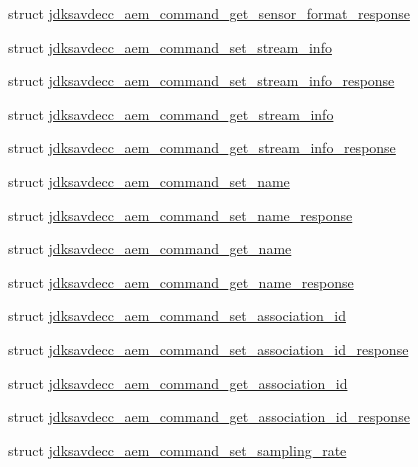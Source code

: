 \begin{DoxyCompactItemize}
\item 
struct \hyperlink{structjdksavdecc__aem__command__get__sensor__format__response}{jdksavdecc\+\_\+aem\+\_\+command\+\_\+get\+\_\+sensor\+\_\+format\+\_\+response}
\item 
struct \hyperlink{structjdksavdecc__aem__command__set__stream__info}{jdksavdecc\+\_\+aem\+\_\+command\+\_\+set\+\_\+stream\+\_\+info}
\item 
struct \hyperlink{structjdksavdecc__aem__command__set__stream__info__response}{jdksavdecc\+\_\+aem\+\_\+command\+\_\+set\+\_\+stream\+\_\+info\+\_\+response}
\item 
struct \hyperlink{structjdksavdecc__aem__command__get__stream__info}{jdksavdecc\+\_\+aem\+\_\+command\+\_\+get\+\_\+stream\+\_\+info}
\item 
struct \hyperlink{structjdksavdecc__aem__command__get__stream__info__response}{jdksavdecc\+\_\+aem\+\_\+command\+\_\+get\+\_\+stream\+\_\+info\+\_\+response}
\item 
struct \hyperlink{structjdksavdecc__aem__command__set__name}{jdksavdecc\+\_\+aem\+\_\+command\+\_\+set\+\_\+name}
\item 
struct \hyperlink{structjdksavdecc__aem__command__set__name__response}{jdksavdecc\+\_\+aem\+\_\+command\+\_\+set\+\_\+name\+\_\+response}
\item 
struct \hyperlink{structjdksavdecc__aem__command__get__name}{jdksavdecc\+\_\+aem\+\_\+command\+\_\+get\+\_\+name}
\item 
struct \hyperlink{structjdksavdecc__aem__command__get__name__response}{jdksavdecc\+\_\+aem\+\_\+command\+\_\+get\+\_\+name\+\_\+response}
\item 
struct \hyperlink{structjdksavdecc__aem__command__set__association__id}{jdksavdecc\+\_\+aem\+\_\+command\+\_\+set\+\_\+association\+\_\+id}
\item 
struct \hyperlink{structjdksavdecc__aem__command__set__association__id__response}{jdksavdecc\+\_\+aem\+\_\+command\+\_\+set\+\_\+association\+\_\+id\+\_\+response}
\item 
struct \hyperlink{structjdksavdecc__aem__command__get__association__id}{jdksavdecc\+\_\+aem\+\_\+command\+\_\+get\+\_\+association\+\_\+id}
\item 
struct \hyperlink{structjdksavdecc__aem__command__get__association__id__response}{jdksavdecc\+\_\+aem\+\_\+command\+\_\+get\+\_\+association\+\_\+id\+\_\+response}
\item 
struct \hyperlink{structjdksavdecc__aem__command__set__sampling__rate}{jdksavdecc\+\_\+aem\+\_\+command\+\_\+set\+\_\+sampling\+\_\+rate}

\end{DoxyCompactItemize}
